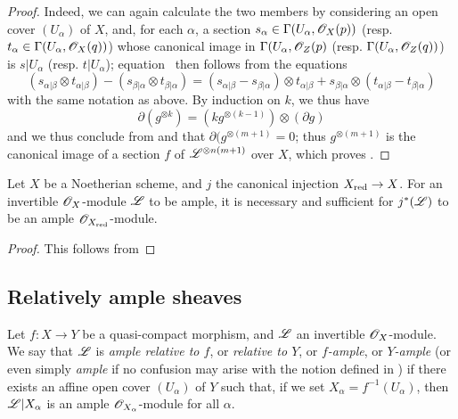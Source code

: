\begin{proof}
  Indeed, we can again calculate the two members by considering an open cover $(U_\alpha)$ of $X$, and, for each $\alpha$, a section $s_\alpha\in\Gamma(U_\alpha,\mathscr{O}_X(p))$ (resp. $t_\alpha\in\Gamma(U_\alpha,\mathscr{O}_X(q))$) whose canonical image in $\Gamma(U_\alpha,\mathscr{O}_Z(p)$ (resp. $\Gamma(U_\alpha,\mathscr{O}_Z(q))$) is $s|U_\alpha$ (resp. $t|U_\alpha$);
  equation~ then follows from the equations
  \[
    (s_{\alpha|\beta}\otimes t_{\alpha|\beta}) - (s_{\beta|\alpha}\otimes t_{\beta|\alpha})
    = (s_{\alpha|\beta} - s_{\beta|\alpha})\otimes t_{\alpha|\beta} + s_{\beta|\alpha}\otimes(t_{\alpha|\beta} - t_{\beta|\alpha})
  \]
  with the same notation as above.
  By induction on $k$, we thus have
  \[
  \label{II.4.5.13.4}
    \partial(g^{\otimes k}) = (kg^{\otimes (k-1)})\otimes(\partial g)
  \tag{4.5.13.4}
  \]
  and we thus conclude from  and  that $\partial(g^{\otimes(m+1)}=0$;
  thus $g^{\otimes(m+1)}$ is the canonical image of a section $f$ of $\mathscr{L}^{\otimes n(m+1)}$ over $X$, which proves .
\end{proof}

\begin{corollary}[4.5.14]
\label{II.4.5.14}
Let $X$ be a Noetherian scheme, and $j$ the canonical injection $X_\red\to X$.
For an invertible $\mathscr{O}_X$-module $\mathscr{L}$ to be ample, it is necessary and sufficient for $j^*(\mathscr{L})$ to be an ample $\mathscr{O}_{X_{\mathrm{red}}}$-module.
\end{corollary}

\begin{proof}
This follows from 
\end{proof}


\subsection{Relatively ample sheaves}
\label{subsection:II.4.6}

\begin{definition}[4.6.1]
\label{II.4.6.1}
Let $f: X\to Y$ be a quasi-compact morphism, and $\mathscr{L}$ an invertible $\mathscr{O}_X$-module.
We say that $\mathscr{L}$ is \emph{ample relative to $f$}, or \emph{relative to $Y$}, or \emph{$f$-ample}, or \emph{$Y$-ample} (or even simply \emph{ample} if no confusion may arise with the notion defined in ) if there exists an affine open cover $(U_\alpha)$ of $Y$ such that, if we set $X_\alpha=f^{-1}(U_\alpha)$, then $\mathscr{L}|X_\alpha$ is an ample $\mathscr{O}_{X_\alpha}$-module for all $\alpha$.
\end{definition}

